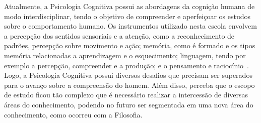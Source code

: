 Atualmente, a Psicologia Cognitiva possui as abordagens da cognição humana de modo interdisciplinar, tendo o objetivo de compreender e aperfeiçoar os estudos sobre o comportamento humano.
Os instrumentos utilizado nesta escola envolvem a percepção dos sentidos sensoriais e a atenção, como a reconhecimento de padrões, percepção sobre movimento e ação; memória, como é formado e os tipos memória relacionadas a aprendizagem e o esquecimento;
linguagem, tendo por exemplo a percepção, compreender e a produção; e o pensamento e raciocínio~\cite{eysenck2017psi_cognitiva}.
Logo, a Psicologia Cognitiva possui diversos desafios que precisam ser superados para o avanço sobre a compreensão do homem.
Além disso, perceba que o escopo de estudo ficou tão complexo que é necessário realizar a intercessão de diversas áreas do conhecimento, podendo no futuro ser segmentada em uma nova área do conhecimento, como ocorreu com a Filosofia.
